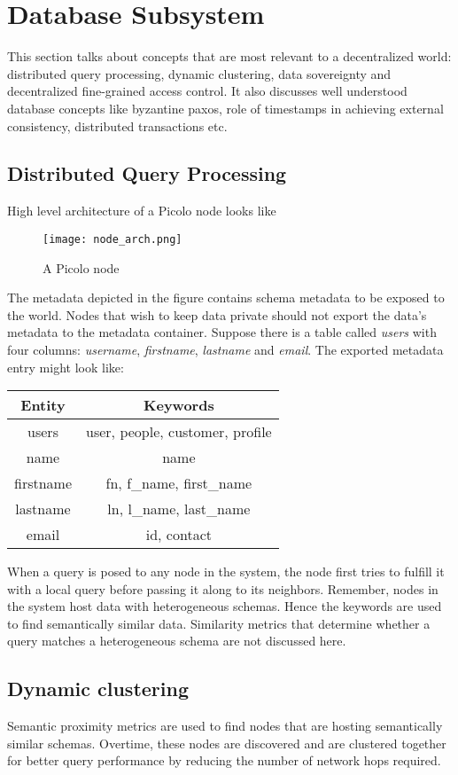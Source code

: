 \section{Database Subsystem}
This section talks about concepts that are most relevant to a decentralized world: distributed query processing, dynamic clustering, data sovereignty and decentralized fine-grained access control. It also discusses well understood database concepts like byzantine paxos, role of timestamps in achieving external consistency, distributed transactions etc.
\subsection{Distributed Query Processing} High level architecture of a Picolo node looks like 
\begin{figure}[h!] \centering
	\texttt{[image: node\_arch.png]}
	\caption{A Picolo node}
	\label{fig:node_arch}
\end{figure}
The metadata depicted in the figure contains schema metadata to be exposed to the world. Nodes that wish to keep data private should not export the data's metadata to the metadata container. Suppose there is a table called \textit{users} with four columns: \textit{username}, \textit{firstname}, \textit{lastname} and \textit{email}. The exported metadata entry might look like:
\begin{center}
	\begin{tabular}{| c | c |} 
		\hline
		Entity & Keywords \\ [0.5ex] 
		\hline
		users & user, people, customer, profile\\ 
		\hline
		name & name \\
		\hline
		firstname & fn, {f\_name}, {first\_name} \\
		\hline
		lastname & ln, {l\_name}, {last\_name} \\
		\hline
		email & id, contact \\ [1ex] 
		\hline
	\end{tabular}
\end{center}
When a query is posed to any node in the system, the node first tries to fulfill it with a local query before passing it along to its neighbors. Remember, nodes in the system host data with heterogeneous schemas. Hence the keywords are used to find semantically similar data. Similarity metrics that determine whether a query matches a heterogeneous schema are not discussed here.
\subsection{Dynamic clustering} \label{sec:dynamic_cluster}
Semantic proximity metrics are used to find nodes that are hosting semantically similar schemas. Overtime, these nodes are discovered and are clustered together for better query performance by reducing the number of network hops required.
